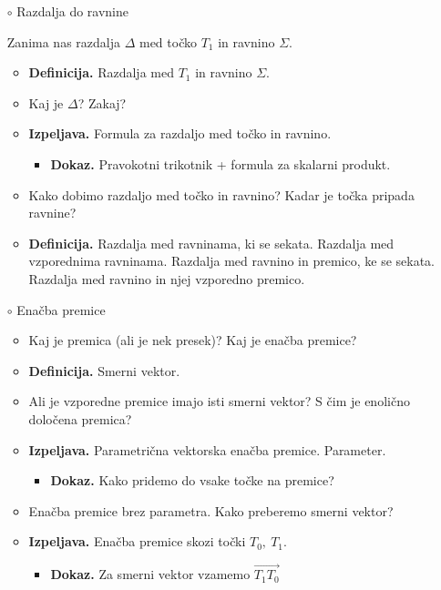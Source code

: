 \begin{enumerate}
    \item[$\circ$] Razdalja do ravnine
    
    Zanima nas razdalja $\Delta$ med točko $T_1$ in ravnino $\Sigma$.
    \begin{itemize}
        \item \colorbox{purple!30}{\textbf{Definicija.}} Razdalja med $T_1$ in ravnino $\Sigma$.
        \item Kaj je $\Delta$? Zakaj?
        \item \colorbox{blue!30}{\textbf{Izpeljava.}} Formula za razdaljo med točko in ravnino.
        \begin{itemize}
            \item \colorbox{green!30}{\textbf{Dokaz.}} Pravokotni trikotnik + formula za skalarni produkt.
        \end{itemize}        
        \item Kako dobimo razdaljo med točko in ravnino? Kadar je točka pripada ravnine?
        \item \colorbox{purple!30}{\textbf{Definicija.}} Razdalja med ravninama, ki se sekata. Razdalja med vzporednima ravninama. Razdalja med ravnino in premico, ke se sekata. Razdalja med ravnino in njej vzporedno premico. 
    \end{itemize}

    \newpage
    \item[$\circ$] Enačba premice
    \begin{itemize}
        \item Kaj je premica (ali je nek presek)? Kaj je enačba premice?
        \item \colorbox{purple!30}{\textbf{Definicija.}} Smerni vektor.
        \item Ali je vzporedne premice imajo isti smerni vektor? S čim je enolično določena premica?
        \item \colorbox{blue!30}{\textbf{Izpeljava.}} Parametrična vektorska enačba premice. Parameter.
        \begin{itemize}
            \item \colorbox{green!30}{\textbf{Dokaz.}} Kako pridemo do vsake točke na premice?
        \end{itemize}
        \item Enačba premice brez parametra. Kako preberemo smerni vektor?
        \item \colorbox{blue!30}{\textbf{Izpeljava.}} Enačba premice skozi točki $T_0, \ T_1$.
        \begin{itemize}
            \item \colorbox{green!30}{\textbf{Dokaz.}} Za smerni vektor vzamemo $\overrightarrow{T_1 T_0}$
        \end{itemize}
    \end{itemize}


\end{enumerate}
